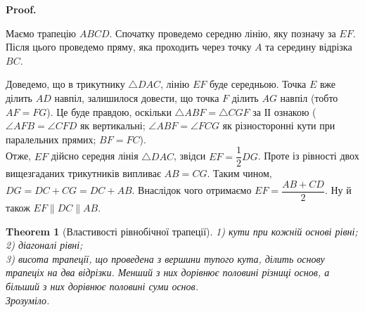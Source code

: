 \documentclass[a4paper, 10pt]{article}
\makeatletter
\def\qed{$\blacksquare$}
\theoremstyle{theoremdd}
\newtheorem{theorem}{Theorem}[subsection]
\theoremstyle{theoremdd}
\theoremstyle{theoremdd}
\theoremstyle{theoremdd}
\theoremstyle{theoremdd}
\theoremstyle{theoremdd}
\theoremstyle{theoremdd}
\theoremstyle{theoremdd}
\theoremstyle{theoremdd}
\renewenvironment{proof}[1][Proof.\\]{\par
\pushQED{\hfill \qed}%
\normalfont \topsep6\p@\@plus6\p@\relax
\trivlist
\item\relax
{\bfseries
#1\@addpunct{.}}\hspace\labelsep\ignorespaces
}{%
\popQED\endtrivlist\@endpefalse
}
\makeatother
\begin{document}
\begin{proof}
Маємо трапецію $ABCD$. Спочатку проведемо середню лінію, яку позначу за $EF$. Після цього проведемо пряму, яка проходить через точку $A$ та середину відрізка $BC$.
\begin{figure}[H]
\centering
{}
\end{figure}
Доведемо, що в трикутнику $\triangle DAC$, лінію $EF$ буде середньою. Точка $E$ вже ділить $AD$ навпіл, залишилося довести, що точка $F$ ділить $AG$ навпіл (тобто $AF = FG$). Це буде правдою, оскільки $\triangle ABF = \triangle CGF$ за ІІ ознакою ($\angle AFB = \angle CFD$ як вертикальні; $\angle ABF = \angle FCG$ як різносторонні кути при паралельних прямих; $BF = FC$).\\
Отже, $EF$ дійсно середня лінія $\triangle DAC$, звідси $EF = \dfrac{1}{2}DG$. Проте із рівності двох вищезгаданих трикутників випливає $AB = CG$. Таким чином, $DG = DC + CG = DC + AB$. Внаслідок чого отримаємо $EF = \dfrac{AB + CD}{2}$. Ну й також $EF \parallel DC \parallel AB$.
\end{proof}

\begin{theorem}[Властивості рівнобічної трапеції]
1) кути при кожній основі рівні;\\
2) діагоналі рівні;\\
3) висота трапеції, що проведена з вершини тупого кута, ділить основу трапеціх на два відрізки. Менший з них дорівнює половині різниці основ, а більший з них дорівнює половині суми основ.\\
\textit{Зрозуміло.}
\end{theorem}
\end{document}
